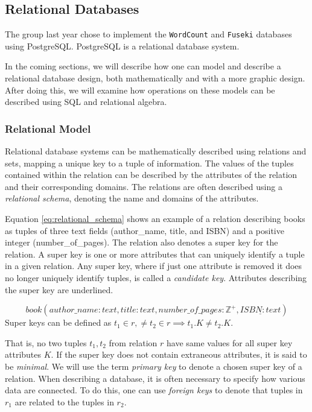 \subsection{Relational Databases}\label{relational_databases}
The group last year chose to implement the \texttt{WordCount} and \texttt{Fuseki} databases using PostgreSQL.
PostgreSQL is a relational database system\cite{knox2020}.

In the coming sections, we will describe how one can model and describe a relational database design, both mathematically and with a more graphic design.
After doing this, we will examine how operations on these models can be described using SQL and relational algebra.

\subsubsection*{Relational Model}
Relational database systems can be mathematically described using relations and sets, mapping a unique key to a tuple of information\cite{DBSBook}.
The values of the tuples contained within the relation can be described by the attributes of the relation and their corresponding domains\cite{KatjaFirstPP}. 
The relations are often described using a \textit{relational schema}, denoting the name and domains of the attributes.


Equation \ref{eq:relational_schema} shows an example of a relation describing books as tuples of three text fields (author\_name, title, and ISBN) and a positive integer (number\_of\_pages).
The relation also denotes a super key for the relation. A super key is one or more attributes that can uniquely identify a tuple in a given relation.
Any super key, where if just one attribute is removed it does no longer uniquely identify tuples, is called a \textit{candidate key}.
Attributes describing the super key are underlined.

\begin{equation} \label{eq:relational_schema}
    book(author\_name:text, title: text, number\_of\_pages:\mathbb{Z}^+, \underline{ISBN: text})
\end{equation}
Super keys can be defined as $t_1 \in r,\neq t_2 \in r \implies t_1.K \neq t_2.K$. 

That is, no two tuples $t_1, t_2$ from relation $r$ have same values for all super key attributes $K$. 
If the super key does not contain extraneous attributes, it is said to be \textit{minimal}. \cite{DBSBook}
We will use the term \textit{primary key} to denote a chosen super key of a relation. 
When describing a database, it is often necessary to specify how various data are connected. 
To do this, one can use \textit{foreign keys} to denote that tuples in $r_1$ are related to the tuples in $r_2$.


